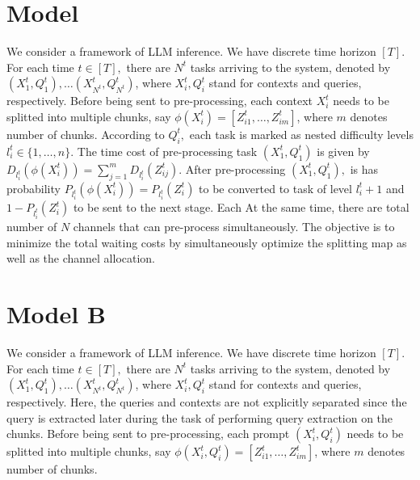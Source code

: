 \documentclass[opre, nonblindrev]{informs3} %
\begin{document}

\maketitle

\section{Model}
We consider a framework of LLM inference. We have discrete time horizon $[T]$. For each time $t\in[T],$ there are $N^t$ tasks arriving to the system, denoted by $(X_1^{t},Q_1^{t}),\dots(X_{N^t}^{t},Q_{N^t}^{t})$, where $X_i^{t},Q_i^{t}$ stand for contexts and queries, respectively. Before being sent to pre-processing, each context $X_i^{t}$ needs to be splitted into multiple chunks, say $\phi(X_i^t) = [Z_{i1}^t,\dots,Z_{im}^t]$, where $m$ denotes number of chunks. According to $Q_i^t,$ each task is marked as nested difficulty levels $l_i^t\in\{1,\dots,n\}.$ The time cost of pre-processing task $(X_1^{t},Q_1^{t})$ is given by $D_{l_i^t}(\phi(X_i^t))=\sum_{j=1}^mD_{l_i^t}(Z_{ij}^t)$. After pre-processing $(X_1^{t},Q_1^{t}),$ is has probability $P_{l_i^t}(\phi(X_i^t))=P_{l_i^t}(Z_i^t)$ to be converted to task of level $l_i^t+1$ and $1-P_{l_i^t}(Z_i^t)$ to be sent to the next stage. Each At the same time, there are total number of $N$ channels that can pre-process simultaneously. The objective is to minimize the total waiting costs by simultaneously optimize the splitting map as well as the channel allocation.

\section{Model B}
We consider a framework of LLM inference. We have discrete time horizon $[T]$. For each time $t\in[T],$ there are $N^t$ tasks arriving to the system, denoted by $(X_1^{t},Q_1^{t}),\dots(X_{N^t}^{t},Q_{N^t}^{t})$, where $X_i^{t},Q_i^{t}$ stand for contexts and queries, respectively. Here, the queries and contexts are not explicitly separated since the query is extracted later during the task of performing query extraction on the chunks. Before being sent to pre-processing, each prompt $(X_i^{t}, Q_i^t)$ needs to be splitted into multiple chunks, say $\phi(X_i^{t}, Q_i^t) = [Z_{i1}^t,\dots,Z_{im}^t]$, where $m$ denotes number of chunks. 
\end{document}
